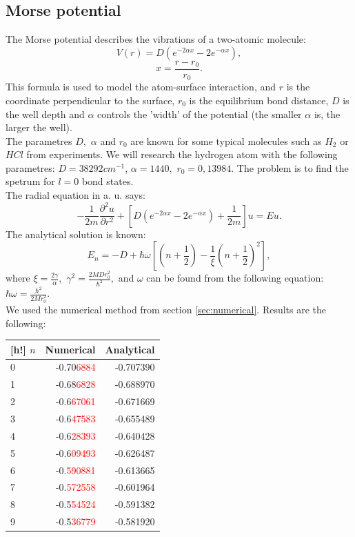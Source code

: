 \documentclass[a4paper, 12pt]{article}
\begin{document}
\subsection{Morse potential}
The Morse potential describes the vibrations of a two-atomic molecule:
\begin{equation}
V(r) = D(e^{-2\alpha x} - 2e^{-\alpha x}), 
\end{equation}
$$x= \frac{r-r_0}{r_0}.$$
This formula is used to model the atom-surface interaction, and  $r$ is the coordinate perpendicular to the surface, $r_0$ is the equilibrium bond distance, $D$ is the well depth and $\alpha$ controls the 'width' of the potential (the smaller $\alpha$ is, the larger the well). \\
The parametres $D,$ $\alpha$ and $r_0$ are known for some typical molecules such as $H_2$ or $H Cl$ from experiments. We will research the hydrogen atom with the following parametres: $D = 38292 cm^{-1}$, $\alpha= 1440,$ $r_0 = 0,13984.$ The problem is to find the spetrum for $l=0$ bond states. \\
The radial equation 
in a. u.  says:
$$-\frac{1}{2m}\frac{\partial^2 u}{\partial r^2}+[D(e^{-2\alpha x} - 2e^{-\alpha x})+\frac{1}{2m}]u = Eu.$$
The analytical solution is known:
$$E_n = -D + \hbar \omega [(n+\frac{1}{2}) - \frac{1}{\xi}(n+\frac{1}{2})^2],$$
where $\xi = \frac{2 \gamma}{\alpha},$ $\gamma^2 = \frac{2 M D r_0^2}{\hbar^2},$ and $\omega$ can be found from the following equation: $\hbar \omega = \frac{\hbar^2}{2 M  r_0^2}.$\\
We used the numerical method from section \ref{sec:numerical}. Results are the following:
\\
\begin{tabular}{lrr}[h!]
	\toprule
	$n$ &      Numerical & Analytical \\
	\midrule
	0 & -0.70\textcolor{red}{6884} & -0.707390 \\
	1 & -0.68\textcolor{red}{6828} & -0.688970 \\
	2 & -0.6\textcolor{red}{67061} & -0.671669 \\
	3 & -0.6\textcolor{red}{47583} & -0.655489 \\
	4 & -0.6\textcolor{red}{28393} & -0.640428 \\
	5 & -0.6\textcolor{red}{09493} & -0.626487 \\
	6 & -0.\textcolor{red}{590881} & -0.613665 \\
	7 & -0.\textcolor{red}{572558} & -0.601964 \\
	8 & -0.5\textcolor{red}{54524} & -0.591382 \\
	9 & -0.5\textcolor{red}{36779} & -0.581920 \\
	\bottomrule
\end{tabular}
\end{document}
